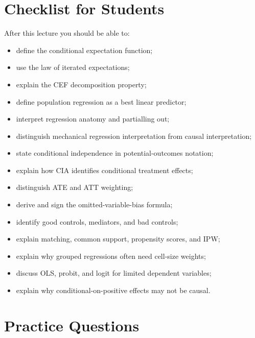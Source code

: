 \section{Checklist for Students}

After this lecture you should be able to:
\begin{itemize}
    \item define the conditional expectation function;
    \item use the law of iterated expectations;
    \item explain the CEF decomposition property;
    \item define population regression as a best linear predictor;
    \item interpret regression anatomy and partialling out;
    \item distinguish mechanical regression interpretation from causal interpretation;
    \item state conditional independence in potential-outcomes notation;
    \item explain how CIA identifies conditional treatment effects;
    \item distinguish ATE and ATT weighting;
    \item derive and sign the omitted-variable-bias formula;
    \item identify good controls, mediators, and bad controls;
    \item explain matching, common support, propensity scores, and IPW;
    \item explain why grouped regressions often need cell-size weights;
    \item discuss OLS, probit, and logit for limited dependent variables;
    \item explain why conditional-on-positive effects may not be causal.
\end{itemize}

\section{Practice Questions}

